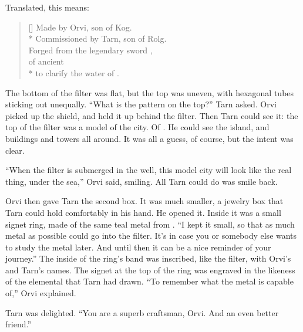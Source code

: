 
Translated, this means:

\settowidth{\versewidth}{Commissioned by Tarn, son of Rolg}
\begin{verse}[\versewidth]
Made by Orvi, son of Kog.\\*
Commissioned by Tarn, son of Rolg.\\
Forged from the legendary sword \kildir,\\
of ancient \valdunmir\\*
to clarify the water of \korbarthrond.
\end{verse}

The bottom of the filter was flat, but the top was uneven, with hexagonal tubes sticking out unequally.  ``What is the pattern on the top?'' Tarn asked.  Orvi picked up the shield, and held it up behind the filter.  Then Tarn could see it:  the top of the filter was a model of the city.  Of \valdunmir.  He could see the island, and buildings and towers all around.  It was all a guess, of course, but the intent was clear.

``When the filter is submerged in the well, this model city will look like the real thing, under the sea,'' Orvi said, smiling.  All Tarn could do was smile back.

Orvi then gave Tarn the second box.  It was much smaller, a jewelry box that Tarn could hold comfortably in his hand.  He opened it.  Inside it was a small signet ring, made of the same teal metal from \kildir.  ``I kept it small, so that as much metal as possible could go into the filter.  It's in case you or somebody else wants to study the metal later.  And until then it can be a nice reminder of your journey.''  The inside of the ring's band was inscribed, like the filter, with Orvi's and Tarn's names.  The signet at the top of the ring was engraved in the likeness of the elemental that Tarn had drawn.  ``To remember what the metal is capable of,'' Orvi explained.

Tarn was delighted.  ``You are a superb craftsman, Orvi.  And an even better friend.''
